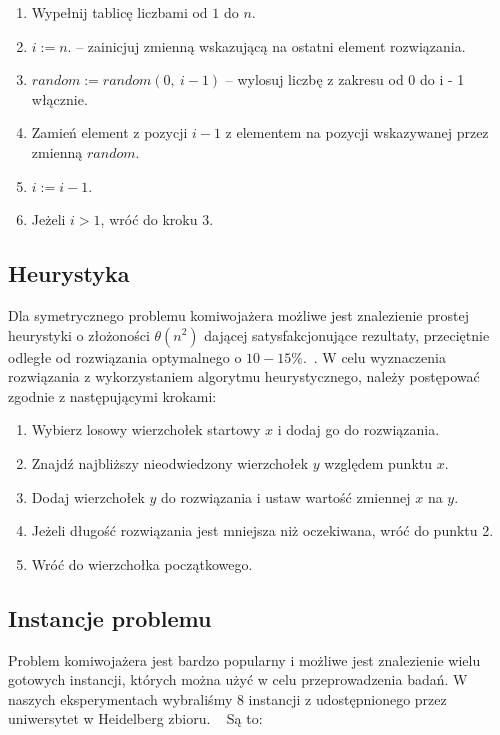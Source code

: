 \begin{enumerate}
    \item Wypełnij tablicę liczbami od $1$ do $n$.
    \item $i := n$. -- zainicjuj zmienną wskazującą na ostatni element rozwiązania.
    \item $random := random(0,\ i - 1) $ -- wylosuj liczbę z zakresu od 0 do i - 1 włącznie.
    \item Zamień element z pozycji $i-1$ z elementem na pozycji wskazywanej przez zmienną $random$.
    \item $i := i-1$.
    \item Jeżeli $i>1$, wróć do kroku 3.
\end{enumerate}


\subsection{Heurystyka}

Dla symetrycznego problemu komiwojażera możliwe jest znalezienie prostej heurystyki o złożoności $\theta(n^2)$ dającej satysfakcjonujące rezultaty, przeciętnie odległe od rozwiązania optymalnego o $10-15\%$.~\cite{Heuristic}. W celu wyznaczenia rozwiązania z wykorzystaniem algorytmu heurystycznego, należy postępować zgodnie z następującymi krokami:

\newpage

\begin{enumerate}
    \item Wybierz losowy wierzchołek startowy $x$ i dodaj go do rozwiązania.
    \item Znajdź najbliższy nieodwiedzony wierzchołek $y$ względem punktu $x$.
  	\item Dodaj wierzchołek $y$ do rozwiązania i ustaw wartość zmiennej $x$ na $y$.
    \item Jeżeli długość rozwiązania jest mniejsza niż oczekiwana, wróć do punktu 2.
    \item Wróć do wierzchołka początkowego.
\end{enumerate}

\subsection{Instancje problemu}

Problem komiwojażera jest bardzo popularny i możliwe jest znalezienie wielu gotowych instancji, których można użyć w celu przeprowadzenia badań. W naszych eksperymentach wybraliśmy 8 instancji z udostępnionego przez uniwersytet w Heidelberg zbioru. ~\cite{instances} Są to:

